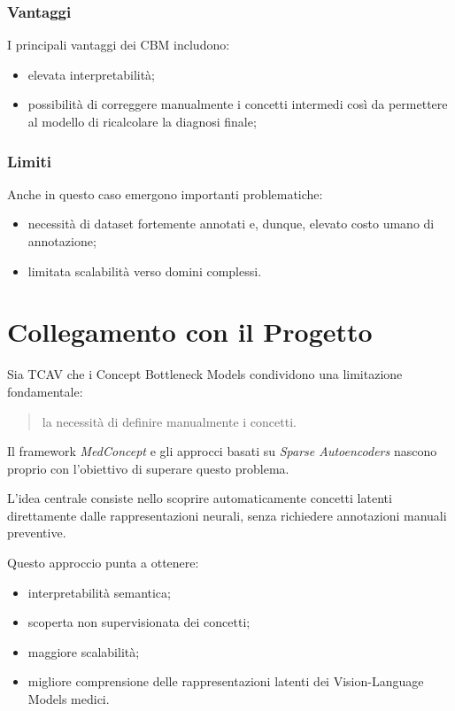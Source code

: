 \subsubsection{Vantaggi}

I principali vantaggi dei CBM includono:

\begin{itemize}
    \item elevata interpretabilità;
    
    \item possibilità di correggere manualmente i concetti intermedi così da permettere al modello di ricalcolare la diagnosi finale;
\end{itemize}

\subsubsection{Limiti}

Anche in questo caso emergono importanti problematiche:

\begin{itemize}
    \item necessità di dataset fortemente annotati e, dunque, elevato costo umano di annotazione;
    
    \item limitata scalabilità verso domini complessi.
\end{itemize}

\section{Collegamento con il Progetto}

Sia TCAV che i Concept Bottleneck Models condividono una limitazione fondamentale:

\begin{quote}
la necessità di definire manualmente i concetti.
\end{quote}

Il framework \textit{MedConcept} e gli approcci basati su \textit{Sparse Autoencoders} nascono proprio con l'obiettivo di superare questo problema.

L'idea centrale consiste nello scoprire automaticamente concetti latenti direttamente dalle rappresentazioni neurali, senza richiedere annotazioni manuali preventive.

Questo approccio punta a ottenere:

\begin{itemize}
    \item interpretabilità semantica;
    
    \item scoperta non supervisionata dei concetti;
    
    \item maggiore scalabilità;
    
    \item migliore comprensione delle rappresentazioni latenti dei Vision-Language Models medici.
\end{itemize}